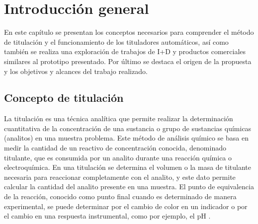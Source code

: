 
\chapter{Introducción general} %

\label{Chapter1} %
\label{IntroGeneral}


\newcommand{\keyword}[1]{\textbf{#1}}
\newcommand{\tabhead}[1]{\textbf{#1}}
\newcommand{\code}[1]{\texttt{#1}}
\newcommand{\file}[1]{\texttt{\bfseries#1}}
\newcommand{\option}[1]{\texttt{\itshape#1}}
\newcommand{\grados}{$^{\circ}$}


En este capítulo se presentan los conceptos necesarios para comprender el método de titulación y el funcionamiento de los tituladores automáticos, así como también se realiza una exploración de trabajos de I+D y productos comerciales similares al prototipo presentado. Por último se destaca el origen de la propuesta y los objetivos y alcances del trabajo realizado.

\section{Concepto de titulación}

La titulación es una técnica analítica que permite realizar la determinación cuantitativa de la concentración de una sustancia o grupo de sustancias químicas (analitos) en una muestra problema. Este método de análisis químico se basa en medir la cantidad de un reactivo de concentración conocida, denominado titulante, que es consumida por un analito durante una reacción química o electroquímica. En una titulación se determina el volumen o la masa de titulante necesaria para reaccionar completamente con el analito, y este dato permite calcular la cantidad del analito presente en una muestra. El punto de equivalencia de la reacción, conocido como punto final cuando es determinado de manera experimental, se puede determinar por el cambio de color en un indicador o por el cambio en una respuesta instrumental, como por ejemplo, el pH \citep{BOOK:1}.

